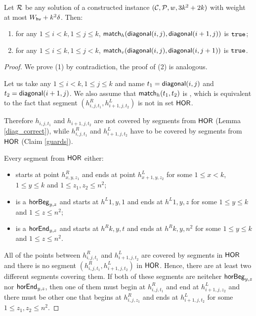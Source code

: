 \begin{lemma}
\label{vertical_horizontal_synchronized}
Let $\mathcal{R}$ be any solution
of a constructed instance $(\mathcal{C}, \mathcal{P}, w, 3k^2+2k)$
with weight at most $W_{\mathsf{hv}}+k^2\delta$. Then:
\begin{enumerate}
\item 
for any $1 \le i < k, 1 \le j \le k$,
$\mathsf{match}_h(\mathsf{diagonal}(i, j),\mathsf{diagonal}(i+1, j))$ is $\texttt{true}$;
\item 
for any $1 \le i \le k, 1 \le j < k$,
$\mathsf{match}_v(\mathsf{diagonal}(i, j),\mathsf{diagonal}(i, j+1))$ is $\texttt{true}$.
\end{enumerate}
\end{lemma}

\begin{proof}
We prove (1) by contradiction, the proof of (2) is analogous.

Let us take any $1 \le i < k, 1 \le j \le k$
and name $t_1 = \mathsf{diagonal}(i, j)$ and $t_2 = \mathsf{diagonal}(i+1, j)$.
We also assume that $\mathsf{match}_h(t_1,t_2)$ is \false,
which is equivalent to the fact that
segment $(h_{i,j,t_1}^R, h_{i+1,j,t_2}^L)$
is not in set $\mathsf{HOR}$.

Therefore $h_{i,j,t_1}$ and $h_{i+1,j,t_2}$
are not covered by segments from $\mathsf{HOR}$ (Lemma \ref{diag_correct}),
while $h^R_{i,j,t_1}$ and $h^L_{i+1,j,t_2}$
have to be covered by segments from $\mathsf{HOR}$ (Claim \ref{guards}).


Every segment from $\mathsf{HOR}$ either:
\begin{itemize}
\item starts at point $h^R_{x,y,z_1}$
and ends at point $h^L_{x+1,y,z_2}$ for some
$1 \le x < k$,$1 \le y \le k$ and $1 \le z_1, z_2 \le n^2$;
\item is a $\mathsf{horBeg}_{y,z}$ 
and starts at $h^L{1,y,1}$ and ends at $h^L{1,y,z}$ for some $1 \le y \le k$ and $1 \le z \le n^2$;
\item is a $\mathsf{horEnd}_{y,z}$
and starts at $h^R{k,y,t}$ and ends at $h^R{k,y,n^2}$ for some $1 \le y \le k$ and $1 \le z \le n^2$.
\end{itemize}
All of the points between $h^R_{i,j,t_1}$ and $h^L_{i+1,j,t_2}$
are covered by segments in $\mathsf{HOR}$ 
and there is no segment $(h^R_{i,j,t_1}, h^L_{i+1,j,t_2})$ in $\mathsf{HOR}$.
Hence, there are at least two different segments covering them.
If both of these segments are neiteher $\mathsf{horBeg}_{y,z}$ nor $\mathsf{horEnd}_{y,z}$,
then one of them must begin
at $h^R_{i,j,t_1}$ and end at $h^L_{i+1,j,z_2}$
and there must be other one that begins at $h^R_{i,j,z_1}$
and ends at $h^L_{i+1,j,t_2}$
for some $1 \le z_1, z_2 \le n^2$.


\end{proof}
